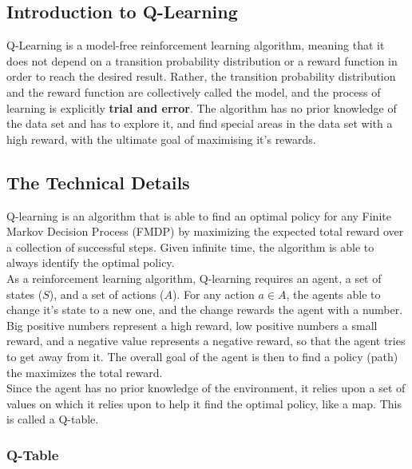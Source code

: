 \documentclass[11pt]{article}
\begin{document}
\begin{multicols}{2}

\section{Introduction to Q-Learning}

Q-Learning is a model-free reinforcement learning algorithm, meaning that it does not depend on a transition probability distribution or a reward function in order to reach the desired result. Rather, the transition probability distribution and the reward function are collectively called the model, and the process of learning is explicitly \textbf{trial and error}. The algorithm has no prior knowledge of the data set and has to explore it, and find special areas in the data set with a high reward, with the ultimate goal of maximising it's rewards.

\subsection{The Technical Details}

Q-learning is an algorithm that is able to find an optimal policy for any Finite Markov Decision Process (FMDP) by maximizing the expected total reward over a collection of successful steps. Given infinite time, the algorithm is able to always identify the optimal policy.\\
As a reinforcement learning algorithm, Q-learning requires an agent, a set of states ($S$), and a set of actions ($A$). For any action $a\in A$, the agents able to change it's state to a new one, and the change rewards the agent with a number. Big positive numbers represent a high reward, low positive numbers a small reward, and a negative value represents a negative reward, so that the agent tries to get away from it. The overall goal of the agent is then to find a policy (path) the maximizes the total reward.\\
Since the agent has no prior knowledge of the environment, it relies upon a set of values on which it relies upon to help it find the optimal policy, like a map. This is called a Q-table.

\subsubsection{Q-Table}


\end{multicols}
\end{document}
